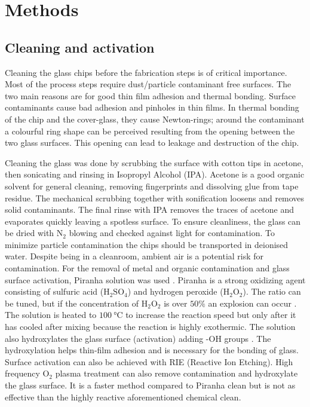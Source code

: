 \documentclass[final]{jyflluk}
\begin{document}
\section{Methods}
\label{sec:methods}

\subsection{Cleaning and activation}
\label{sec:xx1}

Cleaning the glass chips before the fabrication steps is of critical importance. Most of the process steps require dust/particle contaminant free surfaces. The two main reasons are for good thin film adhesion and thermal bonding. Surface contaminants cause bad adhesion and pinholes in thin films. In thermal bonding of the chip and the cover-glass, they cause Newton-rings; around the contaminant a colourful ring shape can be perceived resulting from the opening between the two glass surfaces. This opening can lead to leakage and destruction of the chip.

Cleaning the glass was done by scrubbing the surface with cotton tips in acetone, then sonicating and rinsing in Isopropyl Alcohol (IPA). Acetone is a good organic solvent for general cleaning, removing fingerprints and dissolving glue from tape residue. The mechanical scrubbing together with sonification loosens and removes solid contaminants. The final rinse with IPA removes the traces of acetone and evaporates quickly leaving a spotless surface. To ensure cleanliness, the glass can be dried with $\mathrm{N_2}$ blowing and checked against light for contamination.  To minimize particle contamination the chips should be transported in deionised water. Despite being in a cleanroom, ambient air is a potential risk for contamination. 
For the removal of metal and organic contamination and glass surface activation, Piranha solution was used \cite{franssila2010introduction}. Piranha is a strong oxidizing agent consisting of sulfuric acid ($\mathrm{H_2 SO_4}$) and hydrogen peroxide ($\mathrm{H_2 O_2}$). The ratio can be tuned, but if the concentration of $\mathrm{H_2 O_2}$ is over $50 \percent$ an explosion can occur \cite{piranha2014}. The solution is heated to $\SI{100}{\celsius}$ to increase the reaction speed but only after it has cooled after mixing because the reaction is highly exothermic. The solution also hydroxylates the glass surface (activation) adding -OH groups \cite{klug2013chemical}. The hydroxylation helps thin-film adhesion and is necessary for the bonding of glass. Surface activation can also be achieved with RIE (Reactive Ion Etching)\cite{lazauskas2012float}. High frequency $\mathrm{O_2}$ plasma treatment can also remove contamination and  hydroxylate the glass surface. It is a faster method compared to Piranha clean but is not as effective than the highly reactive aforementioned chemical clean.
\end{document}
